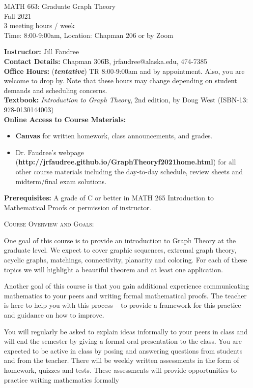 \documentclass[11pt]{article}
\begin{document}
\begin{center}MATH 663: Graduate Graph Theory  \\ Fall 2021 \\ 3 meeting hours / week  \\ Time: 8:00-9:00am, Location: Chapman 206 or by Zoom
\end{center}

\hrulefill

\textbf{Instructor:} Jill Faudree\\
\textbf{Contact Details:} Chapman 306B, jrfaudree@alaska.edu, 474-7385\\
\textbf{Office Hours:} (\textbf{\emph{tentative}})  TR 8:00-9:00am and by appointment. Also, you are welcome to drop by. Note that these hours may change depending on student demands and scheduling concerns.\\
\textbf{Textbook:} \emph{Introduction to Graph Theory}, 2nd edition, by Doug West (ISBN-13: 978-0130144003)\\
\textbf{Online Access to Course Materials:} 
\begin{itemize}
	\item \textbf{Canvas} for written homework, class announcements, and grades.
	\item Dr. Faudree's webpage (\textbf{http://jrfaudree.github.io/GraphTheoryf2021home.html}) for all other course materials including the day-to-day schedule, review sheets and midterm/final exam solutions. 
	\end{itemize}
\textbf{Prerequisites:} A grade of C or better in MATH 265 Introduction to Mathematical Proofs or permission of instructor.\\

\hrulefill

{\textsc{Course Overview and Goals:}}

One goal of this course is to provide an introduction to Graph Theory at the graduate level.  We expect to cover graphic sequences, extremal graph theory, acyclic graphs, matchings, connectivity, planarity and coloring. For each of these topics we will highlight a beautiful theorem and at least one application. 

Another goal of this course is that you gain additional experience communicating mathematics
to your peers and writing formal mathematical proofs.
The teacher is here to help you with this process -- to provide a framework for this practice and guidance on how to improve. 

You will regularly be asked to explain ideas informally to your peers in class and will end the semester by giving a formal oral presentation to the class. You are expected to be active in class by posing and answering questions from students and from the teacher.  There will be weekly written assessments in the form of homework, quizzes and tests. These assessments will provide opportunities to practice writing mathematics formally\\
\end{document}
